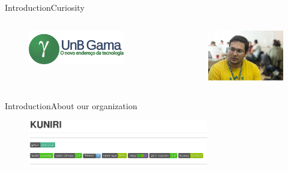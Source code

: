 \documentclass[10pt]{beamer}
\begin{document}
\begin{frame}{Introduction}{Curiosity}

  \begin{columns}
  \begin{column}{0.4\textwidth}
    \begin{figure}[fga]
      \includegraphics[width=0.8\textwidth]{images/fga.png}
    \end{figure}
  \end{column}

  \begin{column}{0.4\textwidth}
    \begin{figure}[paulo]
      \includegraphics[width=1.2\textwidth]{images/prmm.jpg}
    \end{figure}
  \end{column}
  \end{columns}

\end{frame}


\begin{frame}{Introduction}{About our organization}
  \begin{figure}[overview]
    \includegraphics[width=0.7\textwidth]{images/github.png}
  \end{figure}
\end{frame}
\end{document}
